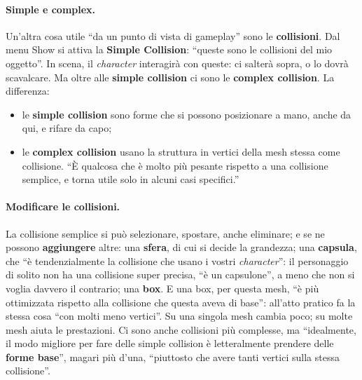 \paragraph{Simple e complex.} Un'altra cosa utile ``da un punto di vista di gameplay''
sono le \textbf{collisioni}. Dal menu Show si attiva la \textbf{Simple Collision}: ``queste
sono le collisioni del mio oggetto''. In scena, il \emph{character} interagirà con
queste: ci salterà sopra, o lo dovrà scavalcare. Ma oltre alle \textbf{simple
collision} ci sono le \textbf{complex collision}. La differenza:
\begin{itemize}
  \item le \textbf{simple collision} sono forme che si possono posizionare a mano,
        anche da qui, e rifare da capo;
  \item le \textbf{complex collision} usano la struttura in vertici della mesh stessa
        come collisione. ``È qualcosa che è molto più pesante rispetto a una collisione
        semplice, e torna utile solo in alcuni casi specifici.''
\end{itemize}

\paragraph{Modificare le collisioni.} La collisione semplice si può selezionare,
spostare, anche eliminare; e se ne possono \textbf{aggiungere} altre: una
\textbf{sfera}, di cui si decide la grandezza; una \textbf{capsula}, che ``è
tendenzialmente la collisione che usano i vostri \emph{character}'': il personaggio di
solito non ha una collisione super precisa, ``è un capsulone'', a meno che non si voglia
davvero il contrario; una \textbf{box}. E una box, per questa mesh, ``è più ottimizzata
rispetto alla collisione che questa aveva di base'': all'atto pratico fa la stessa cosa
``con molti meno vertici''. Su una singola mesh cambia poco; su molte mesh aiuta le
prestazioni. Ci sono anche collisioni più complesse, ma ``idealmente, il modo migliore
per fare delle simple collision è letteralmente prendere delle \textbf{forme base}'',
magari più d'una, ``piuttosto che avere tanti vertici sulla stessa collisione''.

